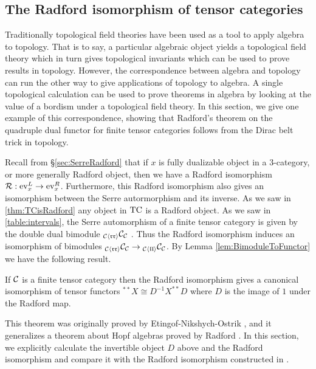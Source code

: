 \documentclass{amsart}
\begin{document}
\subsection{The Radford isomorphism of tensor categories} \label{sec:radiso}

Traditionally topological field theories have been used as a tool to apply algebra to topology.  That is to say, a particular algebraic object yields a topological field theory which in turn gives topological invariants which can be used to prove results in topology.  However, the correspondence between algebra and topology can run the other way to give applications of topology to algebra.  A single topological calculation can be used to prove theorems in algebra by looking at the value of a bordism under a topological field theory.  In this section, we give one example of this correspondence, showing that Radford's theorem on the quadruple dual functor for finite tensor categories follows from the Dirac belt trick in topology.

Recall from \S \ref{sec:SerreRadford} that if $x$ is fully dualizable object in a $3$-category, or more generally Radford object, then we have a Radford isomorphism $\mathcal R: \mathrm{ev}_x^L \rightarrow \mathrm{ev}_x^R$.  Furthermore, this Radford isomorphism also gives an isomorphism between the Serre autormorphism and its inverse.  As we saw in \ref{thm:TCisRadford} any object in $\mathrm{TC}$ is a Radford object.  As we saw in \ref{table:intervals}, the Serre automorphism of a finite tensor category is given by the double dual bimodule ${}_{\mathcal C \langle \mathfrak{r r} \rangle}\mathcal C_{\mathcal C}$ .  Thus the Radford isomorphism induces an isomorphism of bimodules ${}_{\mathcal C \langle \mathfrak{r r} \rangle} \mathcal C_{\mathcal C} \rightarrow {}_{\mathcal C \langle \mathfrak{l l} \rangle} \mathcal C_{\mathcal C}$.  By Lemma \ref{lem:BimoduleToFunctor} we have the following result.

\begin{theorem}
If $\mathcal C$ is a finite tensor category then the Radford isomorphism gives a canonical isomorphism of tensor functors ${}^{**}X \cong D^{-1} X^{**} D$ where $D$ is the image of $1$ under the Radford map.
\end{theorem}

This theorem was originally proved by Etingof-Nikshych-Ostrik \cite{MR2097289}, and it generalizes a theorem about Hopf algebras proved by Radford \cite{MR0407069}.  In this section, we explicitly calculate the invertible object $D$ above and the Radford isomorphism and compare it with the Radford isomorphism constructed in \cite{MR2097289}.
\end{document}
